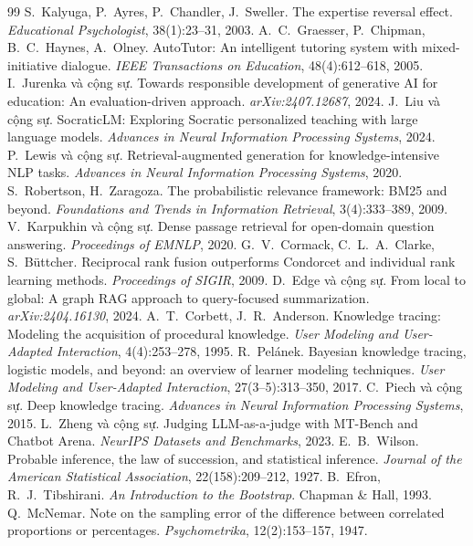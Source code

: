 \begin{thebibliography}{99}
 S.~Kalyuga, P.~Ayres, P.~Chandler, J.~Sweller. The expertise reversal effect. \emph{Educational Psychologist}, 38(1):23--31, 2003.
 A.~C.~Graesser, P.~Chipman, B.~C.~Haynes, A.~Olney. AutoTutor: An intelligent tutoring system with mixed-initiative dialogue. \emph{IEEE Transactions on Education}, 48(4):612--618, 2005.
 I.~Jurenka và cộng sự. Towards responsible development of generative AI for education: An evaluation-driven approach. \emph{arXiv:2407.12687}, 2024.
 J.~Liu và cộng sự. SocraticLM: Exploring Socratic personalized teaching with large language models. \emph{Advances in Neural Information Processing Systems}, 2024.
 P.~Lewis và cộng sự. Retrieval-augmented generation for knowledge-intensive NLP tasks. \emph{Advances in Neural Information Processing Systems}, 2020.
 S.~Robertson, H.~Zaragoza. The probabilistic relevance framework: BM25 and beyond. \emph{Foundations and Trends in Information Retrieval}, 3(4):333--389, 2009.
 V.~Karpukhin và cộng sự. Dense passage retrieval for open-domain question answering. \emph{Proceedings of EMNLP}, 2020.
 G.~V.~Cormack, C.~L.~A.~Clarke, S.~Büttcher. Reciprocal rank fusion outperforms Condorcet and individual rank learning methods. \emph{Proceedings of SIGIR}, 2009.
 D.~Edge và cộng sự. From local to global: A graph RAG approach to query-focused summarization. \emph{arXiv:2404.16130}, 2024.
 A.~T.~Corbett, J.~R.~Anderson. Knowledge tracing: Modeling the acquisition of procedural knowledge. \emph{User Modeling and User-Adapted Interaction}, 4(4):253--278, 1995.
 R.~Pelánek. Bayesian knowledge tracing, logistic models, and beyond: an overview of learner modeling techniques. \emph{User Modeling and User-Adapted Interaction}, 27(3--5):313--350, 2017.
 C.~Piech và cộng sự. Deep knowledge tracing. \emph{Advances in Neural Information Processing Systems}, 2015.
 L.~Zheng và cộng sự. Judging LLM-as-a-judge with MT-Bench and Chatbot Arena. \emph{NeurIPS Datasets and Benchmarks}, 2023.
 E.~B.~Wilson. Probable inference, the law of succession, and statistical inference. \emph{Journal of the American Statistical Association}, 22(158):209--212, 1927.
 B.~Efron, R.~J.~Tibshirani. \emph{An Introduction to the Bootstrap}. Chapman \& Hall, 1993.
 Q.~McNemar. Note on the sampling error of the difference between correlated proportions or percentages. \emph{Psychometrika}, 12(2):153--157, 1947.
\end{thebibliography}
